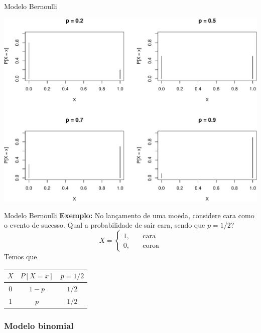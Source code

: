 \documentclass[10pt]{beamer}\usepackage[]{graphicx}\usepackage[]{color}
\newenvironment{knitrout}{}{} %
\theoremstyle{definition}
\begin{document}
\begin{frame}[fragile]{Modelo Bernoulli}
\begin{knitrout}\footnotesize
{}\color{fgcolor}

{\centering \includegraphics[width=1\textwidth]{figure/unnamed-chunk-1-1} 

}



\end{knitrout}
\end{frame}

\begin{frame}[fragile]{Modelo Bernoulli}
  \textbf{Exemplo:} No lançamento de uma moeda, considere cara como o
  evento de sucesso. Qual a probabilidade de sair cara, sendo que $p =
  1/2$?
  \[ X = \left\{
  \begin{array}{ll}
    1, & \quad \text{cara}\\
    0, & \quad \text{coroa}
  \end{array} \right.\]
Temos que
\begin{table}[h]
  \centering
  \begin{tabular}{ccc}
    \hline
    $X$ & $P[X=x]$ & $p = 1/2$ \\
    \hline
    0 & $1-p$ & $1/2$ \\
    1 & $p$ & $1/2$ \\
    \hline
  \end{tabular}
\end{table}
\end{frame}

\subsubsection{Modelo binomial}
\end{document}
